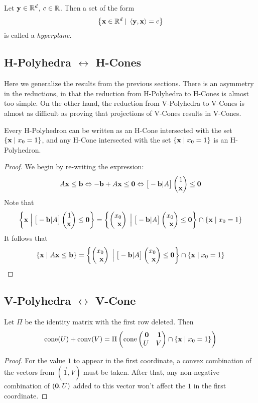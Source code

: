 \begin{Def}[Hyperplane]
	Let $\mathbf{y} \in \mathbb{R}^d$, $c \in \mathbb{R}$.  Then a set of the form
	\[ \left\{\mathbf{x} \in \mathbb{R}^d \;|\; \left\langle \mathbf{y}, \mathbf{x} \right\rangle = c\right\} \]
	is called a \em{hyperplane}.
\end{Def}

\subsection{H-Polyhedra $\leftrightarrow$ H-Cones}

Here we generalize the results from the previous sections.  There is an asymmetry in the reductions, in that the reduction from H-Polyhedra to H-Cones is almost too simple.  On the other hand, the reduction from V-Polyhedra to V-Cones is almost as difficult as proving that projections of V-Cones results in V-Cones.

\newcommand{\hpxz}{\set{\x\st x_0 = 1}}
\begin{Prop}
	Every H-Polyhedron can be written as an H-Cone intersected with the set $\hpxz$, and any H-Cone intersected with the set $\hpxz$ is an H-Polyhedron.
\end{Prop}

\begin{proof}
	We begin by re-writing the expression:
	\[	A\x \leq \b \Leftrightarrow -\b + A\x \leq \0 \Leftrightarrow
		\big[-\b|A\big]\onex \leq \0 \]
	Note that
	\[\set{\x\St\big[-\b|A\big]\onex\leq\0} = \LHC \cap \hpxz \]
	It follows that
	\[ \HP{A}{\b} = \LHC \cap \hpxz \]
\end{proof}

\subsection{V-Polyhedra $\leftrightarrow$ V-Cone}

\begin{Prop}
  Let $\Pi$ be the identity matrix with the first row deleted.  Then
	\[ \VP{U}{V} = \Pi\left(\cone\pmb \0 & \1 \\ U & V \pme \cap \hpxz\right) \]
\end{Prop}

\begin{proof}
	For the value $1$ to appear in the first coordinate, a convex combination of the vectors from $(\vec{1}, V)$ must be taken.  After that, any non-negative combination of $(\mathbf{0},U)$ added to this vector won't affect the $1$ in the first coordinate.
\end{proof}

